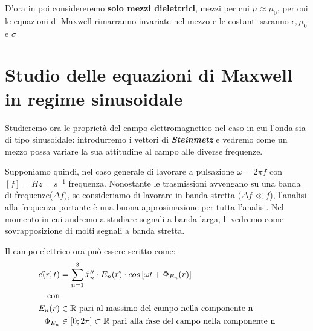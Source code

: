D'ora in poi considereremo \textbf{solo mezzi dielettrici}, mezzi per cui $\mu \approx \mu_0$, per cui
le equazioni di Maxwell rimarranno invariate nel mezzo e le costanti saranno $\epsilon, \mu_0$ e $\sigma$

\section{Studio delle equazioni di Maxwell in regime sinusoidale}
Studieremo ora le proprietà del campo elettromagnetico nel caso in cui l'onda sia di tipo sinusoidale:
introdurremo i vettori di \textbf{\textit{Steinmetz}} e vedremo come un mezzo possa variare la sua
attitudine al campo alle diverse frequenze.

Supponiamo quindi, nel caso generale di lavorare a pulsazione $\omega = 2\pi f$ con $[f] = Hz = s^{-1}$ frequenza.
Nonostante le trasmissioni avvengano su una banda di frequenze($\Delta f$), se consideriamo
di lavorare in banda stretta ($\Delta f \ll f$), l'analisi alla frequenza portante è una buona
approsimazione per tutta l'analisi. Nel momento in cui andremo a studiare segnali a
banda larga, li vedremo come sovrapposizione di molti segnali a banda stretta.

Il campo elettrico ora può essere scritto come:
\begin{equation}\begin{split}
  \vec{e}(\vec{r},t) &= \sum\limits_{n=1}^3 \hat{x}_n^{\prime\prime} \cdot E_n(\vec{r})\cdot cos\left[\omega t + \Phi_{E_n}(\vec{r})\right]\\
  \text{con}& \\
  E_n (\vec{r}) &\in \mathbb{R} \text{ pari al massimo del campo nella componente n} \\
  \Phi_{E_{n}} &\in [0;2\pi]\subset \mathbb{R} \text{ pari alla fase del campo nella componente n} \\
\end{split}\end{equation}


